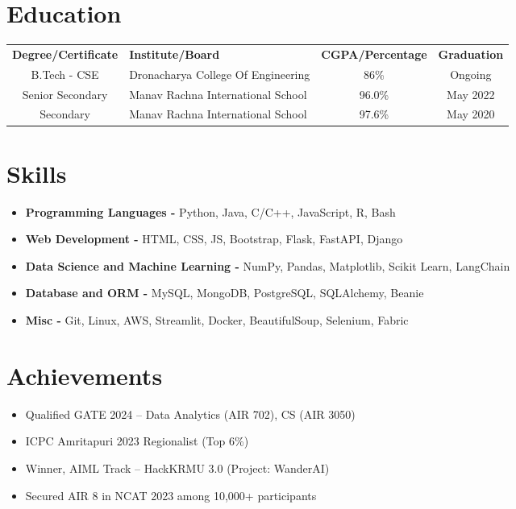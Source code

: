 \documentclass[a4paper,11pt]{article}
\begin{document}
\section{Education}
\vspace{-2mm}
\begin{tabularx}{\textwidth}{cYcc}
  \textbf{Degree/Certificate} & \textbf{Institute/Board} & \textbf{CGPA/Percentage} & \textbf{Graduation} \\
  B.Tech - CSE & Dronacharya College Of Engineering & 86\% & Ongoing \\
  Senior Secondary & Manav Rachna International School & 96.0\% & May 2022 \\
  Secondary & Manav Rachna International School & 97.6\% & May 2020 \\
\end{tabularx}

\section*{Skills}
\vspace{-2mm}
\begin{itemize}[left=0pt,itemsep=1pt,topsep=0pt,parsep=0pt]
    \item \textbf{Programming Languages -} Python, Java, C/C++, JavaScript, R, Bash
    \item \textbf{Web Development -} HTML, CSS, JS, Bootstrap, Flask, FastAPI, Django
    \item \textbf{Data Science and Machine Learning -} NumPy, Pandas, Matplotlib, Scikit Learn, LangChain
    \item \textbf{Database and ORM -} MySQL, MongoDB, PostgreSQL, SQLAlchemy, Beanie
    \item \textbf{Misc -} Git, Linux, AWS, Streamlit, Docker, BeautifulSoup, Selenium, Fabric
\end{itemize}

\section*{Achievements}
\vspace{-2mm}
\begin{itemize}[left=0pt,itemsep=1pt,topsep=0pt,parsep=0pt]
    \item Qualified GATE 2024 -- Data Analytics (AIR 702), CS (AIR 3050)
    \item ICPC Amritapuri 2023 Regionalist (Top 6\%)
    \item Winner, AIML Track -- HackKRMU 3.0 (Project: WanderAI)
    \item Secured AIR 8 in NCAT 2023 among 10,000+ participants
\end{itemize}
\end{document}
